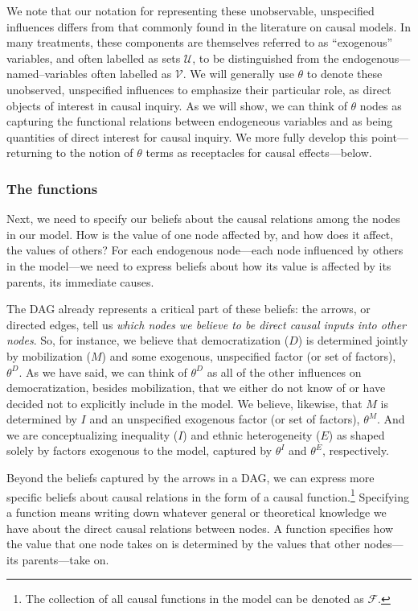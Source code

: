\documentclass[
  12pt,
]{book}
\begin{document}
We note that our notation for representing these unobservable, unspecified influences differs from that commonly found in the literature on causal models. In many treatments, these components are themselves referred to as ``exogenous'' variables, and often labelled as sets \(\mathcal U\), to be distinguished from the endogenous---named--variables often labelled as \(\mathcal V\). We will generally use \(\theta\) to denote these unobserved, unspecified influences to emphasize their particular role, as direct objects of interest in causal inquiry. As we will show, we can think of \(\theta\) nodes as capturing the functional relations between endogeneous variables and as being quantities of direct interest for causal inquiry. We more fully develop this point---returning to the notion of \(\theta\) terms as receptacles for causal effects---below.

\hypertarget{the-functions}{%
\subsubsection{The functions}\label{the-functions}}

Next, we need to specify our beliefs about the causal relations among the nodes in our model. How is the value of one node affected by, and how does it affect, the values of others? For each endogenous node---each node influenced by others in the model---we need to express beliefs about how its value is affected by its parents, its immediate causes.

The DAG already represents a critical part of these beliefs: the arrows, or directed edges, tell us \emph{which nodes we believe to be direct causal inputs into other nodes}. So, for instance, we believe that democratization (\(D\)) is determined jointly by mobilization (\(M\)) and some exogenous, unspecified factor (or set of factors), \(\theta^D\). As we have said, we can think of \(\theta^D\) as all of the other influences on democratization, besides mobilization, that we either do not know of or have decided not to explicitly include in the model. We believe, likewise, that \(M\) is determined by \(I\) and an unspecified exogenous factor (or set of factors), \(\theta^M\). And we are conceptualizing inequality (\(I\)) and ethnic heterogeneity (\(E\)) as shaped solely by factors exogenous to the model, captured by \(\theta^I\) and \(\theta^E\), respectively.

Beyond the beliefs captured by the arrows in a DAG, we can express more specific beliefs about causal relations in the form of a causal function.\footnote{The collection of all causal functions in the model can be denoted as \(\mathcal{F}\).} Specifying a function means writing down whatever general or theoretical knowledge we have about the direct causal relations between nodes. A function specifies how the value that one node takes on is determined by the values that other nodes---its parents---take on.
\end{document}

